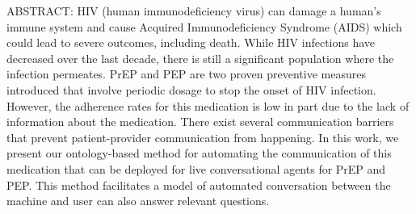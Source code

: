 ABSTRACT: HIV (human immunodeficiency virus) can damage a human's immune system and cause Acquired Immunodeficiency Syndrome (AIDS) which could lead to severe outcomes, including death. While HIV infections have decreased over the last decade, there is still a significant population where the infection permeates. PrEP and PEP are two proven preventive measures introduced that involve periodic dosage to stop the onset of HIV infection. However, the adherence rates for this medication is low in part due to the lack of information about the medication. There exist several communication barriers that prevent patient-provider communication from happening. In this work, we present our ontology-based method for automating the communication of this medication that can be deployed for live conversational agents for PrEP and PEP. This method facilitates a model of automated conversation between the machine and user can also answer relevant questions.
